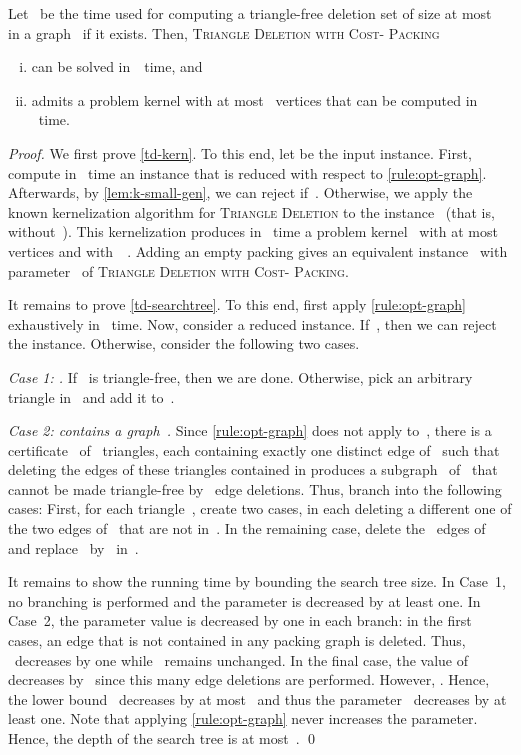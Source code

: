 \documentclass[envcountsame,numbook,smallextended]{svjour3}
\numberwithin{equation}{section}
\numberwithin{figure}{section}
\newcommand{\TAGP}{\textsc{Triangle Deletion with  Cost- Packing}}
\begin{document}
\begin{theorem}\label{thm:td-kern-general}
Let ~be the time used for computing a triangle-free deletion set of size at most~ in a graph~ if it exists. Then, \TAGP{}
  \begin{enumerate}[(i)]
  \item\label{td-searchtree} can be solved in~~time, and
  \item\label{td-kern} admits a problem kernel with at most~ vertices that can be computed in ~time.
  \end{enumerate}
\end{theorem}
\begin{proof}
  We first prove \eqref{td-kern}.  To this end, let  be the input instance.  First, compute in ~time an instance that is reduced with respect to \cref{rule:opt-graph}. Afterwards, by \cref{lem:k-small-gen}, we can reject if~.  Otherwise, we apply the known kernelization algorithm for \textsc{Triangle Deletion} to the instance~ (that is, without~). This kernelization produces in ~time a problem kernel~ with at most~ vertices and with~~\cite{BKM09}. Adding an empty packing gives an equivalent instance~ with parameter~ of \TAGP.

  It remains to prove \eqref{td-searchtree}.  To this end, first apply \cref{rule:opt-graph} exhaustively in ~time.  Now, consider a reduced instance. If~, then we can reject the instance. Otherwise, consider the following two cases.
  
  \emph{Case 1: .} If~ is triangle-free, then we are done. Otherwise, pick an arbitrary triangle in~ and add it to~.

  \emph{Case 2:  contains a graph~.} Since \cref{rule:opt-graph} does not apply to~, there is a certificate~ of~ triangles, each containing exactly one distinct edge of~ such that deleting the edges of these triangles contained in  produces a subgraph~ of~ that cannot be made triangle-free by~ edge deletions.  Thus, branch into the following~ cases: First, for each triangle~, create two cases, in each deleting a different one of the two edges of~ that are not in~. In the remaining case, delete the ~edges of~ and replace~ by~ in~.


  It remains to show the running time by bounding the search tree size. In Case~1, no branching is performed and the parameter is decreased by at least one. In Case~2, the parameter value is decreased by one in each branch: in the first~ cases, an edge that is not contained in any packing graph is deleted. Thus, ~decreases by one while ~remains unchanged. In the final case, the value of~ decreases by~ since this many edge deletions are performed. However, .  Hence, the lower bound~ decreases by at most~ and thus the parameter~ decreases by at least one.  Note that applying \cref{rule:opt-graph} never increases the parameter. Hence, the depth of the search tree is at most~.  \qed\end{proof} 
\end{document}
